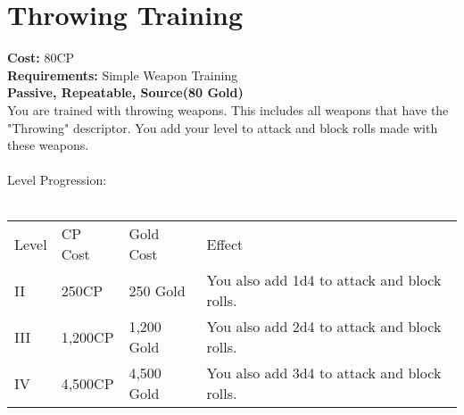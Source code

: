 \section{Throwing Training}\label{perk:throwingTraining}
\textbf{Cost:} 80CP\\
\textbf{Requirements:} Simple Weapon Training\\
\textbf{Passive, Repeatable, Source(80 Gold)}\\
You are trained with throwing weapons.
This includes all weapons that have the "Throwing" descriptor.
You add your level to attack and block rolls made with these weapons.\\
\\
Level Progression:\\
\\
\begin{tabular}{l | l | l | l}
	Level & CP Cost & Gold Cost & Effect\\
	II & 250CP & 250 Gold & You also add 1d4 to attack and block rolls.\\
	III & 1,200CP & 1,200 Gold & You also add 2d4 to attack and block rolls.\\
	IV & 4,500CP & 4,500 Gold & You also add 3d4 to attack and block rolls.\\
\end{tabular}
